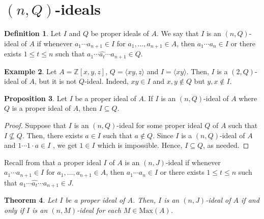 \documentclass[preprint,review,10pt]{amsart}
\newtheorem{theorem}{Theorem}[section]
\theoremstyle{definition}
\newtheorem{definition}[theorem]{Definition}
\newtheorem{example}[theorem]{Example}
\newtheorem{proposition}[theorem]{Proposition}
\theoremstyle{remark}
\numberwithin{equation}{section}
\begin{document}
 








\section{$(n,Q)$-ideals}

\begin{definition}
Let $I$ and $ Q$  be proper ideals of $A$. We say that $I$ is  an  $(n,Q)$-ideal of $A$ if whenever $a_1\cdots a_{n+1} \in I  $ for $a_1,\ldots,a_{n+1} \in A$, then $a_1\cdots  a_n \in I$ or there exists $1 \leq t \leq n$ such that $a_1\cdots \widehat{a_t} \cdots a_{n+1} \in Q.$
\end{definition}
\begin{example}
Let $A=\mathbb{Z}[x,y,z]$, $Q=\langle xy,z  \rangle$ and  $I=\langle xy \rangle$. Then, $I$  is a $(2,Q)$-ideal of $A$, but it is not $Q$-ideal. Indeed, $x  y \in I$ and $x,y \notin Q$ but  $y,x \notin I$.
\end{example}
\begin{proposition} \label{1}
Let $I $   be a proper ideal of $A$. If $I$ is an  $(n,Q)$-ideal of $A$ where $Q$ is a proper ideal of $A$, then $I   \subseteq Q$.
\end{proposition}
\begin{proof}
Suppose that $I$ is an $(n,Q)$-ideal for some proper ideal $Q$ of $A$  such that  $I    \nsubseteq Q$. Then, there exists $a \in I$ such that $a \notin Q$. Since $I$ is a  $(n,Q)$-ideal of $A$ and $1 \cdots 1\cdot  a\in I$ , we get $1  \in I$ which is impossible. Hence, $I \subseteq Q$, as needed.
\end{proof}
Recall from \cite{Khalfi} that a proper ideal $I$ of $A$ is an  $(n,J)$-ideal if whenever $a_1\cdots a_{n+1} \in I  $ for $a_1,\ldots,a_{n+1} \in A$, then $a_1\cdots  a_n \in I$ or there exists $1 \leq t \leq n$ such that $a_1\cdots \widehat{a_t} \cdots a_{n+1} \in J.$ 
\begin{theorem}\label{2}
Let $I$ be a proper ideal of $A$. Then, $I$ is an $(n,J)$-ideal of $A$ if and only if $I$ is an $(n,M)$-ideal for each  $M \in \text{Max}(A)$.
\end{theorem}
\end{document}
